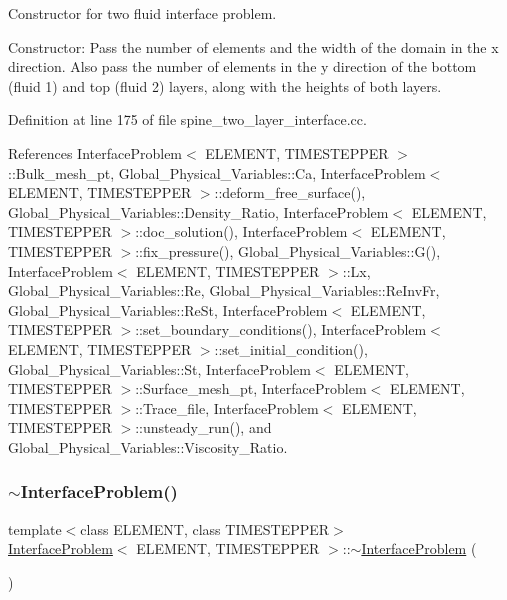 Constructor for two fluid interface problem. 

Constructor\+: Pass the number of elements and the width of the domain in the x direction. Also pass the number of elements in the y direction of the bottom (fluid 1) and top (fluid 2) layers, along with the heights of both layers. 

Definition at line 175 of file spine\+\_\+two\+\_\+layer\+\_\+interface.\+cc.



References Interface\+Problem$<$ E\+L\+E\+M\+E\+N\+T, T\+I\+M\+E\+S\+T\+E\+P\+P\+E\+R $>$\+::\+Bulk\+\_\+mesh\+\_\+pt, Global\+\_\+\+Physical\+\_\+\+Variables\+::\+Ca, Interface\+Problem$<$ E\+L\+E\+M\+E\+N\+T, T\+I\+M\+E\+S\+T\+E\+P\+P\+E\+R $>$\+::deform\+\_\+free\+\_\+surface(), Global\+\_\+\+Physical\+\_\+\+Variables\+::\+Density\+\_\+\+Ratio, Interface\+Problem$<$ E\+L\+E\+M\+E\+N\+T, T\+I\+M\+E\+S\+T\+E\+P\+P\+E\+R $>$\+::doc\+\_\+solution(), Interface\+Problem$<$ E\+L\+E\+M\+E\+N\+T, T\+I\+M\+E\+S\+T\+E\+P\+P\+E\+R $>$\+::fix\+\_\+pressure(), Global\+\_\+\+Physical\+\_\+\+Variables\+::\+G(), Interface\+Problem$<$ E\+L\+E\+M\+E\+N\+T, T\+I\+M\+E\+S\+T\+E\+P\+P\+E\+R $>$\+::\+Lx, Global\+\_\+\+Physical\+\_\+\+Variables\+::\+Re, Global\+\_\+\+Physical\+\_\+\+Variables\+::\+Re\+Inv\+Fr, Global\+\_\+\+Physical\+\_\+\+Variables\+::\+Re\+St, Interface\+Problem$<$ E\+L\+E\+M\+E\+N\+T, T\+I\+M\+E\+S\+T\+E\+P\+P\+E\+R $>$\+::set\+\_\+boundary\+\_\+conditions(), Interface\+Problem$<$ E\+L\+E\+M\+E\+N\+T, T\+I\+M\+E\+S\+T\+E\+P\+P\+E\+R $>$\+::set\+\_\+initial\+\_\+condition(), Global\+\_\+\+Physical\+\_\+\+Variables\+::\+St, Interface\+Problem$<$ E\+L\+E\+M\+E\+N\+T, T\+I\+M\+E\+S\+T\+E\+P\+P\+E\+R $>$\+::\+Surface\+\_\+mesh\+\_\+pt, Interface\+Problem$<$ E\+L\+E\+M\+E\+N\+T, T\+I\+M\+E\+S\+T\+E\+P\+P\+E\+R $>$\+::\+Trace\+\_\+file, Interface\+Problem$<$ E\+L\+E\+M\+E\+N\+T, T\+I\+M\+E\+S\+T\+E\+P\+P\+E\+R $>$\+::unsteady\+\_\+run(), and Global\+\_\+\+Physical\+\_\+\+Variables\+::\+Viscosity\+\_\+\+Ratio.

\mbox{\label{classInterfaceProblem_a90c191f8046069099b199743e7ce7111}} 
\subsubsection{\texorpdfstring{$\sim$\+Interface\+Problem()}{~InterfaceProblem()}\hspace{0.1cm}{\footnotesize\ttfamily [2/2]}}
{\footnotesize\ttfamily template$<$class E\+L\+E\+M\+E\+NT, class T\+I\+M\+E\+S\+T\+E\+P\+P\+ER$>$ \\
\hyperlink{classInterfaceProblem}{Interface\+Problem}$<$ E\+L\+E\+M\+E\+NT, T\+I\+M\+E\+S\+T\+E\+P\+P\+ER $>$\+::$\sim$\hyperlink{classInterfaceProblem}{Interface\+Problem} (\begin{DoxyParamCaption}{ }\end{DoxyParamCaption})\hspace{0.3cm}{\ttfamily [inline]}}



